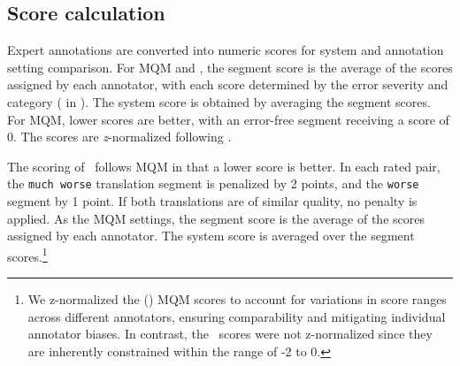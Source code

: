 \subsection{Score calculation}\label{sec:result_score_calc}

Expert annotations are converted into numeric scores for system and annotation setting comparison. For MQM and \sxsmqm, the segment score is the average of the scores assigned by each annotator, with each score determined by the error severity and category ( in ). The system score is obtained by averaging the segment scores. For MQM, lower scores are better, with an error-free segment receiving a score of 0. The scores are \textit{z}-normalized following \citet{riley-etal-2024-finding}.

The scoring of \sxsqr~follows MQM in that a lower score is better. In each rated pair, the \texttt{much worse} translation segment is penalized by 2 points, and the \texttt{worse} segment by 1 point. If both translations are of similar quality, no penalty is applied. As the MQM settings, the segment score is the average of the scores assigned by each annotator. The system score is averaged over the segment scores.\footnote{We z-normalized the (\sxs) MQM scores to account for variations in score ranges across different annotators, ensuring comparability and mitigating individual annotator biases. In contrast, the \sxsqr~scores were not z-normalized since they are inherently constrained within the range of -2 to 0.}